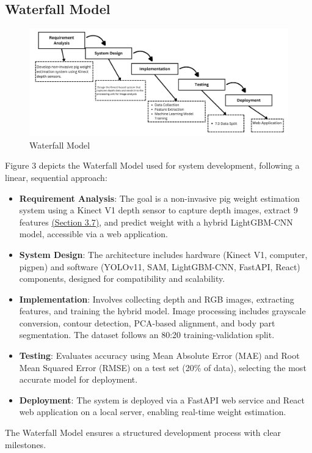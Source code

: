 {\subsection {Waterfall Model}
\begin{figure}[h]
	\centering
	\includegraphics[height=0.3\textheight]{figures/Requirement Analysis (4)}
	\caption{Waterfall Model}
	\label{fig:Waterfall Model}
\end{figure}

Figure 3 depicts the Waterfall Model used for system development, following a linear, sequential approach:
\begin{itemize}
	\item \textbf{Requirement Analysis}: The goal is a non-invasive pig weight estimation system using a Kinect V1 depth sensor to capture depth images, extract 9 features \hyperref[Section 3.7]{(Section 3.7)}, and predict weight with a hybrid LightGBM-CNN model, accessible via a web application.
	\item \textbf{System Design}: The architecture includes hardware (Kinect V1, computer, pigpen) and software (YOLOv11, SAM, LightGBM-CNN, FastAPI, React) components, designed for compatibility and scalability.
	\item \textbf{Implementation}: Involves collecting depth and RGB images, extracting features, and training the hybrid model. Image processing includes grayscale conversion, contour detection, PCA-based alignment, and body part segmentation. The dataset follows an 80:20 training-validation split.
	\item \textbf{Testing}: Evaluates accuracy using Mean Absolute Error (MAE) and Root Mean Squared Error (RMSE) on a test set (20\% of data), selecting the most accurate model for deployment.
	\item \textbf{Deployment}: The system is deployed via a FastAPI web service and React web application on a local server, enabling real-time weight estimation.
\end{itemize}
The Waterfall Model ensures a structured development process with clear milestones.

}

